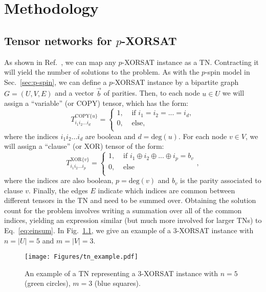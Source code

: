 \chapter{Methodology}

\section{Tensor networks for \texorpdfstring{$p$}{p}-XORSAT}
\label{sec:tn-for-XORSAT}
As shown in Ref.~\cite{garcia-saez_exact_2011}, we can map any $p$-XORSAT instance as a TN.
Contracting it will yield the number of solutions to the problem.
As with the $p$-spin model in Sec.~\ref{sec:p-spin}, we can define a $p$-XORSAT instance by a bipartite graph $G = (U,V,E)$ and a vector $\vec{b}$ of parities.
Then, to each node $u \in U$ we will assign a ``variable'' (or COPY) tensor, which has the form:
\begin{equation}\label{eq:COPY}
    T^{\text{COPY}\{u\}}_{i_1i_2...i_d} = \begin{cases}
        1, & \text{ if } i_1 = i_2 = ... = i_d,\\
        0, & \text{ else,}\\
    \end{cases}
\end{equation}
where the indices $i_1i_2...i_d$ are boolean and $d = \mathrm{deg}(u)$.
For each node $v \in V$, we will assign a ``clause'' (or XOR) tensor of the form:
\begin{equation} \label{eq:XOR-tensor}
    T^{\text{XOR}\{v\}}_{i_1i_2...i_p} = \begin{cases}
        1, & \text{ if } i_1 \oplus i_2 \oplus ... \oplus i_p = b_v\\
        0, & \text{ else }\\
    \end{cases},
\end{equation}
where the indices are also boolean, $p = \mathrm{deg}(v)$ and $b_v$ is the parity associated to clause $v$.
Finally, the edges $E$ indicate which indices are common between different tensors in the TN and need to be summed over.
Obtaining the solution count for the problem involves writing a summation over all of the common indices, yielding an expression similar (but much more involved for larger TNs) to Eq.~\ref{eq:einsum}.
In Fig.~\ref{fig:tn-example}, we give an example of a $3$-XORSAT instance with $n = |U| = 5$ and $m = |V| = 3$.

\begin{figure}[htbp]
    \centering
    \texttt{[image: Figures/tn\_example.pdf]}
    \caption{\label{fig:tn-example}An example of a TN representing a $3$-XORSAT instance with $n = 5$ (green circles), $m = 3$ (blue squares).}
\end{figure}

